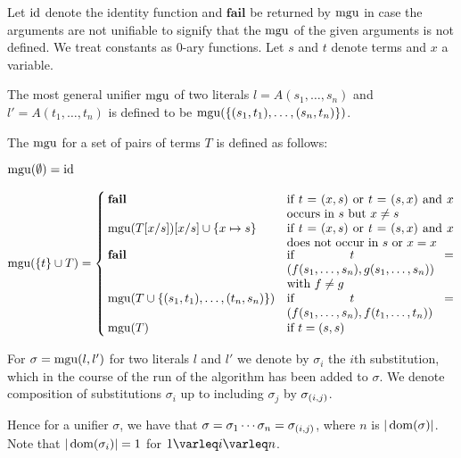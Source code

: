 \begin{defi}
	Let $\operatorname{id}$ denote the identity function and $\textbf{fail}$ be returned by $\operatorname{mgu}$ in case the arguments are not unifiable to signify that the $\operatorname{mgu}$ of the given arguments is not defined. We treat constants as $0$-ary functions.
	Let $s$ and $t$ denote terms and $x$ a variable.

	The most general unifier $\operatorname{mgu}$ of two literals $l = A(s_1,\dotsc, s_n)$ and $l' = A(t_1,\dots, t_n)$ is defined to be $\operatorname{mgu}(\{ (s_1, t_1), \dotsc, (s_n, t_n)\})$.


	The $\operatorname{mgu}$ for a set of pairs of terms $T$ is defined as follows:

	$
	\operatorname{mgu}(\emptyset) = \operatorname{id}
	$

	\newcommand{\aatahfdgasdfg}{.4\textwidth}
	$
	\mbox{$\mgu(\{t\} \cup T)$} =
	\begin{cases}
		\mathbf{fail} 				& \parbox[t]{\aatahfdgasdfg}{if $t = (x, s)$ or $t=(s,x)$ and $x$ occurs in $s$ but $x\neq s$ } \\
		\mgu(T\subst{x/s})\subst{x/s} \cup \{x\mapsto s\} 		& \parbox[t]{\aatahfdgasdfg}{if $t = (x, s)$ or $t=(s,x)$ and $x$ does not occur in $s$ or $x=x$} \\
		\mathbf{fail} 				& \parbox[t]{\aatahfdgasdfg}{if $t = (f(s_1,\dotsc,s_n), g(s_1,\dotsc,s_n))$ with $f\neq g$} \\
		\mgu(T \cup \{(s_1, t_1), \dotsc, (t_n, s_n)\})		& \parbox[t]{\aatahfdgasdfg}{if $t = (f(s_1,\dotsc,s_n), f(t_1,\dotsc,t_n))$} \\
		\mgu(T) 							& \text{if $t=(s, s)$} \\
	\end{cases}
	$

	For $\sigma = \operatorname{mgu}(l, l')$ for two literals $l$ and $l'$ we denote by $\sigma_i$ the $i$th substitution, which in the course of the run of the algorithm has been added to $\sigma$. 
	We denote composition of substitutions $\sigma_i$ up to including $\sigma_j$ by $\sigma_{(i,j)}$.
	\qedhere
\end{defi}

Hence for a unifier $\sigma$, we have that $ \sigma = \sigma_1\cdots\sigma_n = \sigma_{(i,j)}$, where $n$ is $|\operatorname{dom}(\sigma)|$.
Note that $|\operatorname{dom}(\sigma_i)| = 1$ for $1\varleq i \varleq n$.





